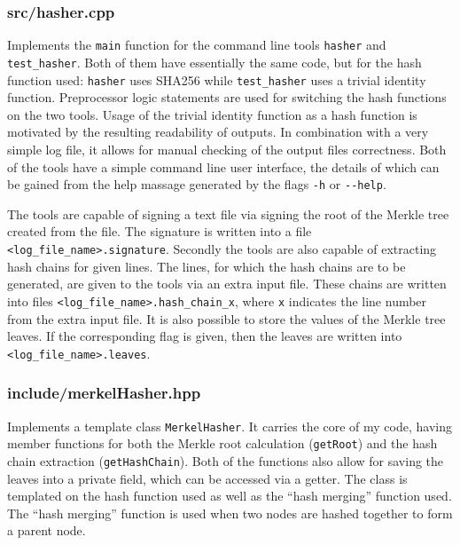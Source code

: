 \documentclass[11pt]{article}
\newcommand{\ct}[1]{\texttt{#1}}
\begin{document}
\subsubsection*{src/hasher.cpp} %
\label{ssub:src_hasher_cpp}

Implements the \ct{main} function for the command line tools \ct{hasher} and \ct{test\_hasher}. Both of them have essentially the same code, but for the hash function used: \ct{hasher} uses SHA256 while \ct{test\_hasher} uses a trivial identity function. Preprocessor logic statements are used for switching the hash functions on the two tools. Usage of the trivial identity function as a hash function is motivated by the resulting readability of outputs. In combination with a very simple log file, it allows for manual checking of the output files correctness. Both of the tools have a simple command line user interface, the details of which can be gained from the help massage generated by the flags \ct{-h} or \ct{-{}-help}. 

The tools are capable of signing a text file via signing the root of the Merkle tree created from the file. The signature is written into a file \ct{<log\_file\_name>.signature}. Secondly the tools are also capable of extracting hash chains for given lines. The lines, for which the hash chains are to be generated, are given to the tools via an extra input file. These chains are written into files \ct{<log\_file\_name>.hash\_chain\_x}, where \ct{x} indicates the line number from the extra input file. It is also possible to store the values of the Merkle tree leaves. If the corresponding flag is given, then the leaves are written into \ct{<log\_file\_name>.leaves}.  


\subsubsection*{include/merkelHasher.hpp} %
\label{ssub:include_merkelhasher_hpp}

Implements a template class \ct{MerkelHasher}. It carries the core of my code, having member functions for both the Merkle root calculation (\ct{getRoot}) and the hash chain extraction (\ct{getHashChain}). Both of the functions also allow for saving the leaves into a private field, which can be accessed via a getter. The class is templated on the hash function used as well as the ``hash merging'' function used. The ``hash merging'' function is used when two nodes are hashed together to form a parent node.     
\end{document}
